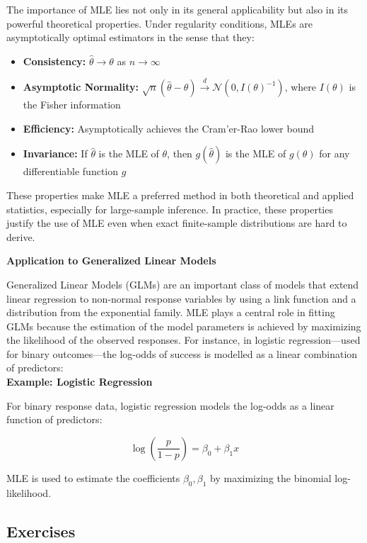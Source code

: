 \documentclass{book}
\begin{document}
The importance of MLE lies not only in its general applicability but also in its powerful theoretical properties. 
Under regularity conditions, MLEs are asymptotically optimal estimators in the sense that they:
\begin{itemize}
\item \textbf{Consistency:} $\hat{\theta} \to \theta$ as $n \to \infty$
\item \textbf{Asymptotic Normality:} $\sqrt{n}(\hat{\theta} - \theta) \xrightarrow{d} \mathcal{N}(0, I(\theta)^{-1})$, where $I(\theta)$ is the Fisher information
\item \textbf{Efficiency:} Asymptotically achieves the Cram'er-Rao lower bound
\item \textbf{Invariance:} If $\hat{\theta}$ is the MLE of $\theta$, then $g(\hat{\theta})$ is the MLE of $g(\theta)$ for any differentiable function $g$
\end{itemize}
These properties make MLE a preferred method in both theoretical and applied statistics, especially for large-sample inference. 
In practice, these properties justify the use of MLE even when exact finite-sample distributions are hard to derive.

\textbf{Application to Generalized Linear Models}

Generalized Linear Models (GLMs) are an important class of models that extend linear regression to non-normal response variables by using a link function and a distribution from the exponential family. MLE plays a central role in fitting GLMs because the estimation of the model parameters is achieved by maximizing the likelihood of the observed responses.
For instance, in logistic regression---used for binary outcomes---the log-odds of success is modelled as a linear combination of predictors:\\

\textbf{Example: Logistic Regression}

For binary response data, logistic regression models the log-odds as a linear function of predictors:

\[
\log\left( \frac{p}{1 - p} \right) = \beta_0 + \beta_1 x
\]

MLE is used to estimate the coefficients $\beta_0, \beta_1$ by maximizing the binomial log-likelihood.

\newpage

\subsection*{Exercises}
\end{document}
